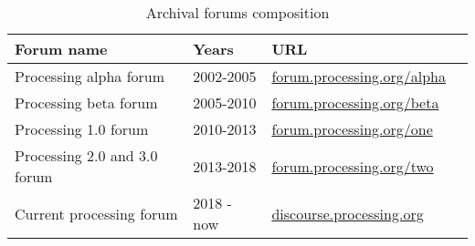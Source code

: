 \begin{table}[h]
    \raggedright
    \begin{tabular}{l l l c}
        \toprule
        Forum name & Years & URL \\
        \midrule
        Processing alpha forum & 2002-2005 & \href{https://forum.processing.org/alpha/}{forum.processing.org/alpha} \\
        Processing beta forum & 2005-2010 & \href{https://forum.processing.org/beta/}{forum.processing.org/beta}  \\
        Processing 1.0 forum & 2010-2013 & \href{https://forum.processing.org/one/}{forum.processing.org/one} \\
        Processing 2.0 and 3.0 forum & 2013-2018 & \href{https://forum.processing.org/two/}{forum.processing.org/two} \\
        Current processing forum & 2018 - now & \href{https://discourse.processing.org/}{discourse.processing.org} \\
        \bottomrule
    \end{tabular}
    \caption{Archival forums composition}
    \label{table:forums}
  \end{table}